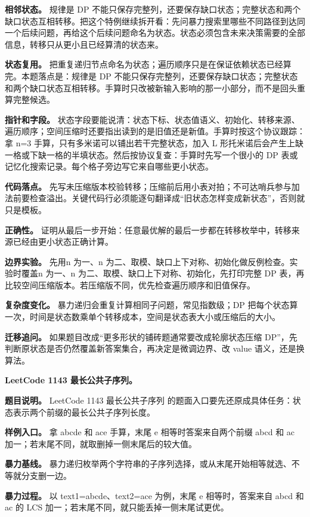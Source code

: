 \textbf{相邻状态。} 规律是 DP 不能只保存完整列，还要保存缺口状态；完整状态和两个缺口状态互相转移。把这个特例继续拆开看：先问暴力搜索里哪些不同路径到达同一个后续问题，再给这个后续问题命名为状态。状态必须包含未来决策需要的全部信息，转移只从更小且已经算清的状态来。

\textbf{状态复用。} 把重复递归节点命名为状态；遍历顺序只是在保证依赖状态已经算完。本题落点是：规律是 DP 不能只保存完整列，还要保存缺口状态；完整状态和两个缺口状态互相转移。手算时只改被新输入影响的那一小部分，而不是回头重算完整候选。

\textbf{指针和字段。} 状态字段要能说清：状态下标、状态值语义、初始化、转移来源、遍历顺序；空间压缩时还要指出读到的是旧值还是新值。手算时按这个协议跟踪：拿 n=3 手算，只有多米诺可以铺出若干完整状态，加入 L 形托米诺后会产生上缺一格或下缺一格的半填状态。然后按协议复查：手算时先写一个很小的 DP 表或记忆化搜索记录。每个格子旁边写它来自哪些更小状态。

\textbf{代码落点。} 先写未压缩版本校验转移；压缩前后用小表对拍；不可达哨兵参与加法前要检查溢出。关键代码行必须能逐句翻译成“旧状态怎样变成新状态”，否则就只是模板。

\textbf{正确性。} 证明从最后一步开始：任意最优解的最后一步都在转移枚举中，转移来源已经由更小状态正确计算。

\textbf{边界实验。} 先用n 为一、n 为二、取模、缺口上下对称、初始化做反例检查。实验时覆盖n 为一、n 为二、取模、缺口上下对称、初始化，先打印完整 DP 表，再比较空间压缩版本。若压缩版不同，优先检查遍历顺序和旧值保存。

\textbf{复杂度变化。} 暴力递归会重复计算相同子问题，常见指数级；DP 把每个状态算一次，时间是状态数乘单个转移成本，空间是状态表大小或压缩后的大小。

\textbf{迁移追问。} 如果题目改成“更多形状的铺砖题通常要改成轮廓状态压缩 DP”，先判断原状态是否仍然覆盖新答案集合，再决定是微调边界、改 value 语义，还是换算法。

\noindent\textbf{LeetCode 1143 最长公共子序列。}

\textbf{题目说明。} LeetCode 1143 最长公共子序列 的题面入口要先还原成具体任务：状态表示两个前缀的最长公共子序列长度。

\textbf{样例入口。} 拿 abcde 和 ace 手算，末尾 e 相等时答案来自两个前缀 abcd 和 ac 加一；若末尾不同，就取删掉一侧末尾后的较大值。

\textbf{暴力基线。} 暴力递归枚举两个字符串的子序列选择，或从末尾开始相等就选、不等就分支删一边。

\textbf{暴力过程。} 以 text1=abcde、text2=ace 为例，末尾 e 相等时，答案来自 abcd 和 ac 的 LCS 加一；若末尾不同，就只能丢掉一侧末尾试更优。

